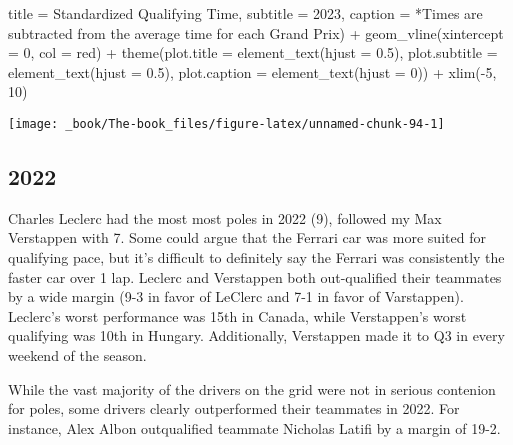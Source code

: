 \documentclass[
]{book}
\newenvironment{Shaded}{\begin{snugshade}}{\end{snugshade}}
\newcommand{\AttributeTok}[1]{\textcolor[rgb]{0.77,0.63,0.00}{#1}}
\newcommand{\DecValTok}[1]{\textcolor[rgb]{0.00,0.00,0.81}{#1}}
\newcommand{\FloatTok}[1]{\textcolor[rgb]{0.00,0.00,0.81}{#1}}
\newcommand{\FunctionTok}[1]{\textcolor[rgb]{0.00,0.00,0.00}{#1}}
\newcommand{\NormalTok}[1]{#1}
\newcommand{\SpecialCharTok}[1]{\textcolor[rgb]{0.00,0.00,0.00}{#1}}
\newcommand{\StringTok}[1]{\textcolor[rgb]{0.31,0.60,0.02}{#1}}
\begin{document}
\begin{Shaded}
\begin{Highlighting}[]
       \AttributeTok{title =} \StringTok{\textquotesingle{}Standardized Qualifying Time\textquotesingle{}}\NormalTok{,}
       \AttributeTok{subtitle =} \StringTok{\textquotesingle{}2023\textquotesingle{}}\NormalTok{,}
       \AttributeTok{caption =} \StringTok{\textquotesingle{}*Times are subtracted from the average time for each Grand Prix\textquotesingle{}}\NormalTok{) }\SpecialCharTok{+}
  \FunctionTok{geom\_vline}\NormalTok{(}\AttributeTok{xintercept =} \DecValTok{0}\NormalTok{, }\AttributeTok{col =} \StringTok{\textquotesingle{}red\textquotesingle{}}\NormalTok{) }\SpecialCharTok{+}
  \FunctionTok{theme}\NormalTok{(}\AttributeTok{plot.title =} \FunctionTok{element\_text}\NormalTok{(}\AttributeTok{hjust =} \FloatTok{0.5}\NormalTok{),}
        \AttributeTok{plot.subtitle =} \FunctionTok{element\_text}\NormalTok{(}\AttributeTok{hjust =} \FloatTok{0.5}\NormalTok{),}
        \AttributeTok{plot.caption =} \FunctionTok{element\_text}\NormalTok{(}\AttributeTok{hjust =} \DecValTok{0}\NormalTok{)) }\SpecialCharTok{+}
  \FunctionTok{xlim}\NormalTok{(}\SpecialCharTok{{-}}\DecValTok{5}\NormalTok{, }\DecValTok{10}\NormalTok{)}
\end{Highlighting}
\end{Shaded}

\begin{center}\texttt{[image: \_book/The-book\_files/figure-latex/unnamed-chunk-94-1]} \end{center}

\hypertarget{section-1}{%
\subsection{2022}\label{section-1}}

Charles Leclerc had the most most poles in 2022 (9), followed my Max Verstappen with 7. Some could argue that the Ferrari car was more suited for qualifying pace, but it's difficult to definitely say the Ferrari was consistently the faster car over 1 lap. Leclerc and Verstappen both out-qualified their teammates by a wide margin (9-3 in favor of LeClerc and 7-1 in favor of Varstappen). Leclerc's worst performance was 15th in Canada, while Verstappen's worst qualifying was 10th in Hungary. Additionally, Verstappen made it to Q3 in every weekend of the season.

While the vast majority of the drivers on the grid were not in serious contenion for poles, some drivers clearly outperformed their teammates in 2022. For instance, Alex Albon outqualified teammate Nicholas Latifi by a margin of 19-2.
\end{document}
